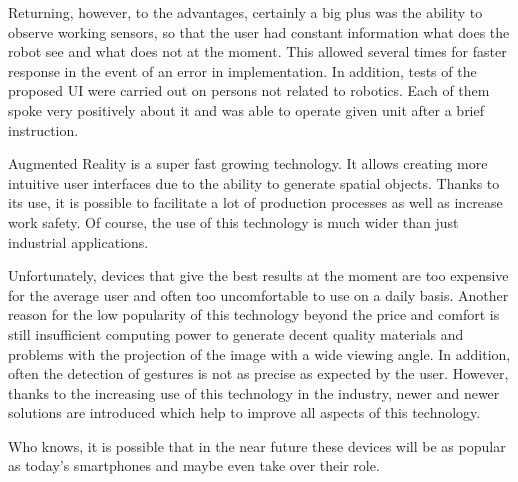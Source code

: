 \documentclass[printmode,en]{mgr}
\begin{document}
Returning, however, to the advantages, certainly a big plus was the ability to observe working sensors, so that the user had constant information what does the robot see and what does not at the moment. This allowed several times for faster response in the event of an error in implementation. In addition, tests of the proposed UI were carried out on persons not related to robotics. Each of them spoke very positively about it and was able to operate given unit after a brief instruction.

Augmented Reality is a super fast growing technology. It allows creating more intuitive user interfaces due to the ability to generate spatial objects. Thanks to its use, it is possible to facilitate a lot of production processes as well as increase work safety. Of course, the use of this technology is much wider than just industrial applications.

Unfortunately, devices that give the best results at the moment are too expensive for the average user and often too uncomfortable to use on a daily basis. Another reason for the low popularity of this technology beyond the price and comfort is still insufficient computing power to generate decent quality materials and problems with the projection of the image with a wide viewing angle. In addition, often the detection of gestures is not as precise as expected by the user. However, thanks to the increasing use of this technology in the industry, newer and newer solutions are introduced which help to improve all aspects of this technology.

Who knows, it is possible that in the near future these devices will be as popular as today's smartphones and maybe even take over their role.

\appendix




\end{document}
